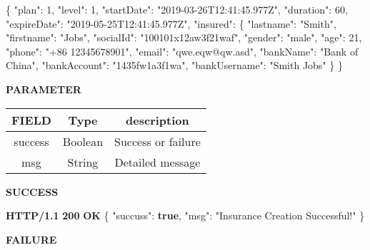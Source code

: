 \documentclass[
]{article}
\newenvironment{Shaded}{}{}
\newcommand{\DataTypeTok}[1]{\textcolor[rgb]{0.56,0.13,0.00}{#1}}
\newcommand{\DecValTok}[1]{\textcolor[rgb]{0.25,0.63,0.44}{#1}}
\newcommand{\ErrorTok}[1]{\textcolor[rgb]{1.00,0.00,0.00}{\textbf{#1}}}
\newcommand{\FunctionTok}[1]{\textcolor[rgb]{0.02,0.16,0.49}{#1}}
\newcommand{\KeywordTok}[1]{\textcolor[rgb]{0.00,0.44,0.13}{\textbf{#1}}}
\newcommand{\StringTok}[1]{\textcolor[rgb]{0.25,0.44,0.63}{#1}}
\begin{document}
\begin{Shaded}
\begin{Highlighting}[]
\FunctionTok{\{}
	\DataTypeTok{"plan"}\FunctionTok{:} \DecValTok{1}\FunctionTok{,}
	\DataTypeTok{"level"}\FunctionTok{:} \DecValTok{1}\FunctionTok{,}
	\DataTypeTok{"startDate"}\FunctionTok{:} \StringTok{"2019-03-26T12:41:45.977Z"}\FunctionTok{,}
	\DataTypeTok{"duration"}\FunctionTok{:} \DecValTok{60}\FunctionTok{,}
	\DataTypeTok{"expireDate"}\FunctionTok{:} \StringTok{"2019-05-25T12:41:45.977Z"}\FunctionTok{,}
	\DataTypeTok{"insured"}\FunctionTok{:} \FunctionTok{\{}
		\DataTypeTok{"lastname"}\FunctionTok{:} \StringTok{"Smith"}\FunctionTok{,}
		\DataTypeTok{"firstname"}\FunctionTok{:} \StringTok{"Jobs"}\FunctionTok{,}
		\DataTypeTok{"socialId"}\FunctionTok{:} \StringTok{"100101x12aw3f21waf"}\FunctionTok{,}
		\DataTypeTok{"gender"}\FunctionTok{:} \StringTok{"male"}\FunctionTok{,}
		\DataTypeTok{"age"}\FunctionTok{:} \DecValTok{21}\FunctionTok{,}
		\DataTypeTok{"phone"}\FunctionTok{:} \StringTok{"+86 12345678901"}\FunctionTok{,}
		\DataTypeTok{"email"}\FunctionTok{:} \StringTok{"qwe.eqw@qw.asd"}\FunctionTok{,}
		\DataTypeTok{"bankName"}\FunctionTok{:} \StringTok{"Bank of China"}\FunctionTok{,}
		\DataTypeTok{"bankAccount"}\FunctionTok{:} \StringTok{"1435fw1a3f1wa"}\FunctionTok{,}
		\DataTypeTok{"bankUsername"}\FunctionTok{:} \StringTok{"Smith Jobs"}
	\FunctionTok{\}}
\FunctionTok{\}}
\end{Highlighting}
\end{Shaded}

\textbf{PARAMETER}

\begin{longtable}[]{@{}ccc@{}}
\toprule
FIELD & Type & description\tabularnewline
\midrule
\endhead
success & Boolean & Success or failure\tabularnewline
msg & String & Detailed message\tabularnewline
\bottomrule
\end{longtable}

\textbf{SUCCESS}

\begin{Shaded}
\begin{Highlighting}[]
\ErrorTok{HTTP/1.1} \ErrorTok{200} \ErrorTok{OK}
\FunctionTok{\{}
    \DataTypeTok{"succuss"}\FunctionTok{:} \KeywordTok{true}\FunctionTok{,}
    \DataTypeTok{"msg"}\FunctionTok{:} \StringTok{"Insurance Creation Successful!"}
\FunctionTok{\}}
\end{Highlighting}
\end{Shaded}

\textbf{FAILURE}
\end{document}
